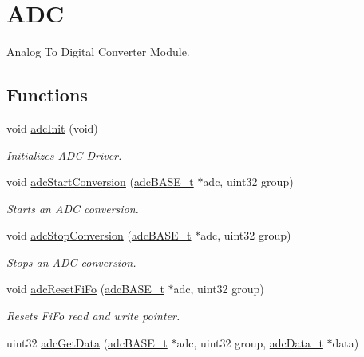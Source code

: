 \hypertarget{group__ADC}{}\section{A\+DC}
\label{group__ADC}


Analog To Digital Converter Module.  


\subsection*{Functions}
\begin{DoxyCompactItemize}
\item 
void \mbox{\hyperlink{group__ADC_gafd645b17cf0581bcaa22c56011c775e4}{adc\+Init}} (void)
\begin{DoxyCompactList}\small\item\em Initializes A\+DC Driver. \end{DoxyCompactList}\item 
void \mbox{\hyperlink{group__ADC_ga92003078c6583152944796afdc7faf88}{adc\+Start\+Conversion}} (\mbox{\hyperlink{reg__adc_8h_ab98b3b090eb1fd96596cd337a5fc0a4e}{adc\+B\+A\+S\+E\+\_\+t}} $\ast$adc, uint32 group)
\begin{DoxyCompactList}\small\item\em Starts an A\+DC conversion. \end{DoxyCompactList}\item 
void \mbox{\hyperlink{group__ADC_ga33b0a3250de093a2227a3d2ca0c1998b}{adc\+Stop\+Conversion}} (\mbox{\hyperlink{reg__adc_8h_ab98b3b090eb1fd96596cd337a5fc0a4e}{adc\+B\+A\+S\+E\+\_\+t}} $\ast$adc, uint32 group)
\begin{DoxyCompactList}\small\item\em Stops an A\+DC conversion. \end{DoxyCompactList}\item 
void \mbox{\hyperlink{group__ADC_ga82f17f0f78bd4cfc96d00d520dcd0d58}{adc\+Reset\+Fi\+Fo}} (\mbox{\hyperlink{reg__adc_8h_ab98b3b090eb1fd96596cd337a5fc0a4e}{adc\+B\+A\+S\+E\+\_\+t}} $\ast$adc, uint32 group)
\begin{DoxyCompactList}\small\item\em Resets Fi\+Fo read and write pointer. \end{DoxyCompactList}\item 
uint32 \mbox{\hyperlink{group__ADC_gac756b9d0f3fc77b1ad5336442895d00f}{adc\+Get\+Data}} (\mbox{\hyperlink{reg__adc_8h_ab98b3b090eb1fd96596cd337a5fc0a4e}{adc\+B\+A\+S\+E\+\_\+t}} $\ast$adc, uint32 group, \mbox{\hyperlink{adc_8h_afee29ee48ab2e8c8be88a9955d37d6b9}{adc\+Data\+\_\+t}} $\ast$data)

\end{DoxyCompactItemize}
